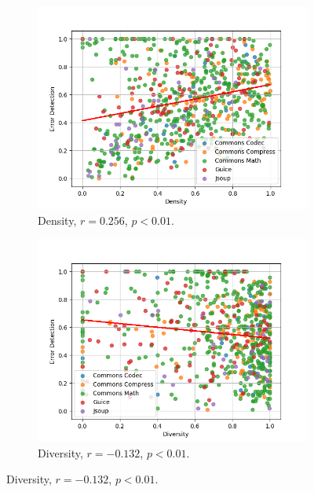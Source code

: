\documentclass[twoside,a4paper,11pt]{memoir}
\begin{document}
\begin{figure}
    \centering
    \begin{subfigure}[b]{0.49\linewidth}
        \centering
        \includegraphics[width=\linewidth]{figures/error_detection_density}
        \caption{Density, \(r=0.256 \), \(p<0.01 \).}%
        \label{fig:error_detection_density}
    \end{subfigure}
    \hfill
    \begin{subfigure}[b]{0.49\linewidth}
        \centering
        \includegraphics[width=\linewidth]{figures/error_detection_diversity}
        \caption{Diversity, \(r=-0.132 \), \(p < 0.01 \).}%
        \label{fig:error_detection_diversity}
    \end{subfigure}

\end{figure}
\end{document}
